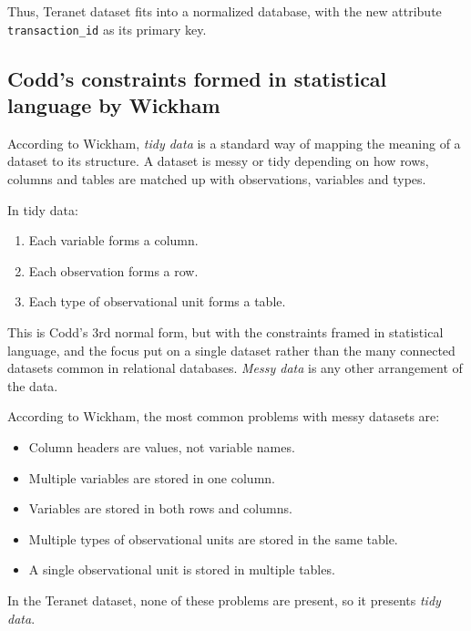 \documentclass[11pt]{article}
\begin{document}
    Thus, Teranet dataset fits into a normalized database, with the new attribute \texttt{transaction\_id} as its primary key.

    \subsection{Codd's constraints formed in statistical language by Wickham} \label{subsec:teranet_tidy_data}

    According to Wickham\cite{Wickham2014}, \textit{tidy data} is a standard way of mapping the meaning of a dataset to its structure.
    A dataset is messy or tidy depending on how rows, columns and tables are matched up with observations,
    variables and types.

    \vspace{5mm}

    In tidy data:
    \begin{enumerate}
        \item Each variable forms a column.
        \item Each observation forms a row.
        \item Each type of observational unit forms a table.
    \end{enumerate}

    This is Codd's 3rd normal form\cite{Codd1990}, but with the constraints framed in statistical
    language, and the focus put on a single dataset rather than the many connected datasets common in relational databases.
    \textit{Messy data} is any other arrangement of the data.

    \vspace{5mm}

    According to Wickham, the most common problems with messy datasets are:
    \begin{itemize}
        \item Column headers are values, not variable names.
        \item Multiple variables are stored in one column.
        \item Variables are stored in both rows and columns.
        \item Multiple types of observational units are stored in the same table.
        \item A single observational unit is stored in multiple tables.
    \end{itemize}

    In the Teranet dataset, none of these problems are present, so it presents \textit{tidy data}.
\end{document}
